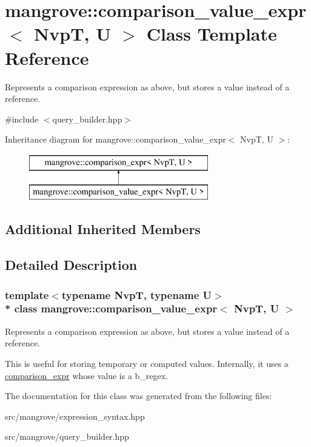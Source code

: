 \hypertarget{classmangrove_1_1comparison__value__expr}{}\section{mangrove\+:\+:comparison\+\_\+value\+\_\+expr$<$ NvpT, U $>$ Class Template Reference}
\label{classmangrove_1_1comparison__value__expr}


Represents a comparison expression as above, but stores a value instead of a reference.  




{\ttfamily \#include $<$query\+\_\+builder.\+hpp$>$}

Inheritance diagram for mangrove\+:\+:comparison\+\_\+value\+\_\+expr$<$ NvpT, U $>$\+:\begin{figure}[H]
\begin{center}
\leavevmode
\includegraphics[height=2.000000cm]{classmangrove_1_1comparison__value__expr}
\end{center}
\end{figure}
\subsection*{Additional Inherited Members}


\subsection{Detailed Description}
\subsubsection*{template$<$typename NvpT, typename U$>$\\*
class mangrove\+::comparison\+\_\+value\+\_\+expr$<$ Nvp\+T, U $>$}

Represents a comparison expression as above, but stores a value instead of a reference. 

This is useful for storing temporary or computed values. Internally, it uses a \hyperlink{classmangrove_1_1comparison__expr}{comparison\+\_\+expr} whose value is a b\+\_\+regex. 

The documentation for this class was generated from the following files\+:\begin{DoxyCompactItemize}
\item 
src/mangrove/expression\+\_\+syntax.\+hpp\item 
src/mangrove/query\+\_\+builder.\+hpp\end{DoxyCompactItemize}
